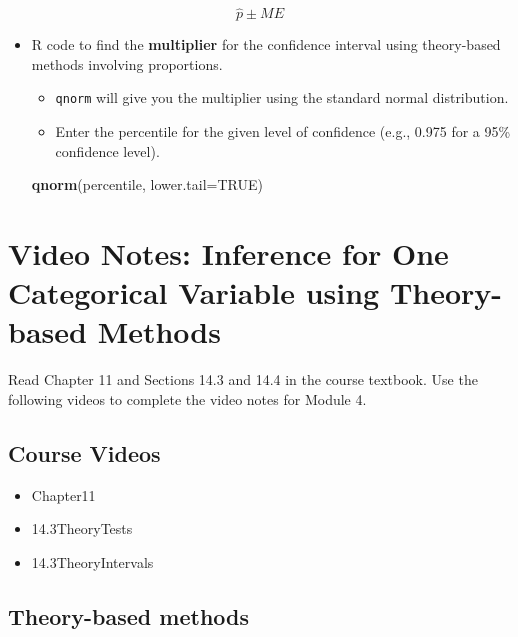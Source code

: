\documentclass[
]{report}
\newenvironment{Shaded}{\begin{snugshade}}{\end{snugshade}}
\newcommand{\AttributeTok}[1]{\textcolor[rgb]{0.13,0.29,0.53}{#1}}
\newcommand{\ConstantTok}[1]{\textcolor[rgb]{0.56,0.35,0.01}{#1}}
\newcommand{\FunctionTok}[1]{\textcolor[rgb]{0.13,0.29,0.53}{\textbf{#1}}}
\newcommand{\NormalTok}[1]{#1}
\begin{document}
\[\hat{p} \pm ME\]

\begin{itemize}
\item
  R code to find the \textbf{multiplier} for the confidence interval using theory-based methods involving proportions.

  \begin{itemize}
  \item
    \texttt{qnorm} will give you the multiplier using the standard normal distribution.
  \item
    Enter the percentile for the given level of confidence (e.g., 0.975 for a 95\% confidence level).
  \end{itemize}

\begin{Shaded}
\begin{Highlighting}[]
\FunctionTok{qnorm}\NormalTok{(percentile, }\AttributeTok{lower.tail=}\ConstantTok{TRUE}\NormalTok{)}
\end{Highlighting}
\end{Shaded}
\end{itemize}

\newpage

\section{Video Notes: Inference for One Categorical Variable using Theory-based Methods}\label{video-notes-inference-for-one-categorical-variable-using-theory-based-methods}

Read Chapter 11 and Sections 14.3 and 14.4 in the course textbook. Use the following videos to complete the video notes for Module 4.

\subsection{Course Videos}\label{course-videos-3}

\begin{itemize}
\item
  Chapter11
\item
  14.3TheoryTests
\item
  14.3TheoryIntervals
\end{itemize}


\subsection*{Theory-based methods}\label{theory-based-methods}
\end{document}
